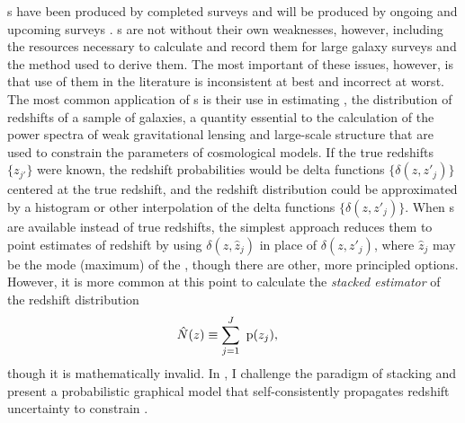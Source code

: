 

\Pzpdf s have been produced by completed surveys \citep{Hildebrandt2012, Sheldon2012} and will be produced by ongoing and upcoming surveys \citep{LSSTScienceCollaboration2009, CarrascoKind2014a, Bonnett2015, Masters2015}.  
\Pzpdf s are not without their own weaknesses, however, including the resources necessary to calculate and record them for large galaxy surveys \citep{CarrascoKind2014} and the method used to derive them.  
The most important of these issues, however, is that use of them in the literature is inconsistent at best and incorrect at worst.  
The most common application of \pzpdf s is their use in estimating \Nz, the distribution of redshifts of a sample of galaxies, a quantity essential to the calculation of the power spectra of weak gravitational lensing and large-scale structure that are used to constrain the parameters of cosmological models.
If the true redshifts $\{z_{j'}\}$ were known, the redshift probabilities would be delta functions $\{\delta(z, z'_{j})\}$ centered at the true redshift, and the redshift distribution could be approximated by a histogram or other interpolation of the delta functions $\{\delta(z, z'_{j})\}$.
When \pzpdf s are available instead of true redshifts, the simplest approach reduces them to point estimates of redshift by using $\delta(z, \hat{z}_{j})$ in place of $\delta(z, z'_{j})$, where $\hat{z}_{j}$ may be the mode (maximum) of the \pzpdf, though there are other, more principled options.
However, it is more common at this point to calculate the \textit{stacked estimator} of the redshift distribution \citep{Lima2008}
\begin{align}
\eqlabel{eqn:stacked}
\hat{N}(z) &\equiv \sum_{j=1}^{J}\ \pr{z_{j}} ,
\end{align}
though it is mathematically invalid.
In , I challenge the paradigm of stacking and present a probabilistic graphical model that self-consistently propagates redshift uncertainty to constrain \Nz.

